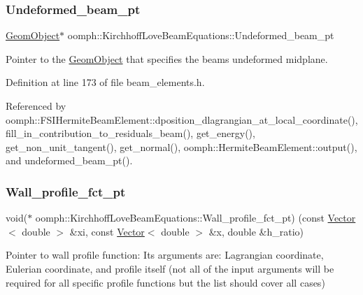 \subsubsection{\texorpdfstring{Undeformed\+\_\+beam\+\_\+pt}{Undeformed\_beam\_pt}}
{\footnotesize\ttfamily \hyperlink{classoomph_1_1GeomObject}{Geom\+Object}$\ast$ oomph\+::\+Kirchhoff\+Love\+Beam\+Equations\+::\+Undeformed\+\_\+beam\+\_\+pt\hspace{0.3cm}{\ttfamily [protected]}}



Pointer to the \hyperlink{classoomph_1_1GeomObject}{Geom\+Object} that specifies the beam\textquotesingle{}s undeformed midplane. 



Definition at line 173 of file beam\+\_\+elements.\+h.



Referenced by oomph\+::\+F\+S\+I\+Hermite\+Beam\+Element\+::dposition\+\_\+dlagrangian\+\_\+at\+\_\+local\+\_\+coordinate(), fill\+\_\+in\+\_\+contribution\+\_\+to\+\_\+residuals\+\_\+beam(), get\+\_\+energy(), get\+\_\+non\+\_\+unit\+\_\+tangent(), get\+\_\+normal(), oomph\+::\+Hermite\+Beam\+Element\+::output(), and undeformed\+\_\+beam\+\_\+pt().

\mbox{\label{classoomph_1_1KirchhoffLoveBeamEquations_a6ca999fcdf45f0cf51b0a74a1025ed53}} 
\subsubsection{\texorpdfstring{Wall\+\_\+profile\+\_\+fct\+\_\+pt}{Wall\_profile\_fct\_pt}}
{\footnotesize\ttfamily void($\ast$ oomph\+::\+Kirchhoff\+Love\+Beam\+Equations\+::\+Wall\+\_\+profile\+\_\+fct\+\_\+pt) (const \hyperlink{classoomph_1_1Vector}{Vector}$<$ double $>$ \&xi, const \hyperlink{classoomph_1_1Vector}{Vector}$<$ double $>$ \&x, double \&h\+\_\+ratio)\hspace{0.3cm}{\ttfamily [protected]}}



Pointer to wall profile function\+: Its arguments are\+: Lagrangian coordinate, Eulerian coordinate, and profile itself (not all of the input arguments will be required for all specific profile functions but the list should cover all cases) 



